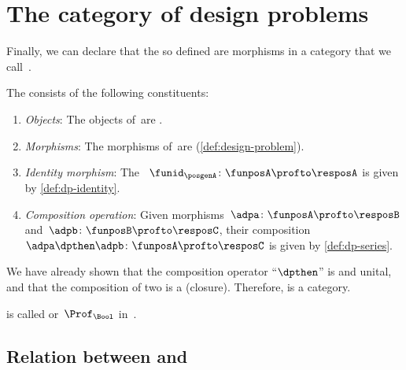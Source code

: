 
\section{The category of  design problems}  \DP

Finally, we can declare that the  so defined are morphisms in a category that we call~\DP.


\begin{definition}
    \label{def:DP}
    The \emph{ \DP} consists of the following constituents:
    \begin{enumerate}
        \item \emph{Objects}: The objects of~\DP are .
        \item \emph{Morphisms}: The morphisms of~\DP are  (\cref{def:design-problem}).
        \item \emph{Identity morphism}: The ~$\funid_\posgenA \colon \funposA \profto \resposA$ is given by \cref{def:dp-identity}.
        \item \emph{Composition operation}: Given morphisms~$\adpa \colon  \funposA \profto \resposB$ and~$\adpb \colon \funposB \profto \resposC$, their composition~$\adpa \dpthen \adpb\colon \funposA\profto \resposC$ is given by \cref{def:dp-series}.
    \end{enumerate}
\end{definition}

We have already shown that the composition operator ``$\dpthen$'' is  and unital, and that the composition of two  is a  (closure).
Therefore, \DP is a category.

\DP is called \feas or~$\Prof_\Bool$ in~\cite{fong2019}.


\subsection{Relation between \DPI and \DP}

